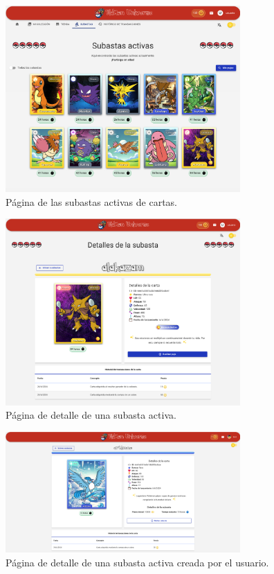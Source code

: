 \begin{figure}[H]
    \centering
    \includegraphics[width=0.8\textwidth]{figures/6-Analisis/6-Interfaz/interfaz/subastas.png}
    \caption{Página de las subastas activas de cartas.}
    \label{fig:interfaz-subastas}
\end{figure}


\begin{figure}[H]
    \centering
    \includegraphics[width=0.8\textwidth]{figures/6-Analisis/6-Interfaz/interfaz/detalle_subasta.png}
    \caption{Página de detalle de una subasta activa.}
    \label{fig:interfaz-detalle-subasta}
\end{figure}

\begin{figure}[H]
    \centering
    \includegraphics[width=0.8\textwidth]{figures/6-Analisis/6-Interfaz/interfaz/mi_subasta_detalle.png}
    \caption{Página de detalle de una subasta activa creada por el usuario.}
    \label{fig:interfaz-detalle-mi-subasta}
\end{figure}


